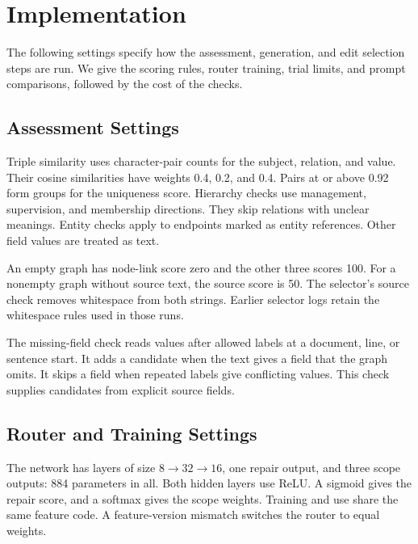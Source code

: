 \section{Implementation}
\label{sec:implementation}

The following settings specify how the assessment, generation, and edit
selection steps are run. We give the scoring rules, router training,
trial limits, and prompt comparisons, followed by the cost of the checks.

\subsection{Assessment Settings}

Triple similarity uses character-pair counts for the subject, relation, and value.
Their cosine similarities have weights 0.4, 0.2, and 0.4.
Pairs at or above 0.92 form groups for the uniqueness score.
Hierarchy checks use management, supervision, and membership directions.
They skip relations with unclear meanings.
Entity checks apply to endpoints marked as entity references.
Other field values are treated as text.

An empty graph has node-link score zero and the other three scores 100.
For a nonempty graph without source text, the source score is 50.
The selector's source check removes whitespace from both strings.
Earlier selector logs retain the whitespace rules used in those runs.

The missing-field check reads values after allowed labels at a document,
line, or sentence start. It adds a candidate when the text gives a field
that the graph omits. It skips a field when repeated labels give conflicting
values. This check supplies candidates from explicit source fields.

\subsection{Router and Training Settings}

The network has layers of size $8\!\rightarrow\!32\!\rightarrow\!16$,
one repair output, and three scope outputs: 884 parameters in all.
Both hidden layers use ReLU. A sigmoid gives the repair score, and a softmax
gives the scope weights. Training and use share the same feature code.
A feature-version mismatch switches the router to equal weights.

